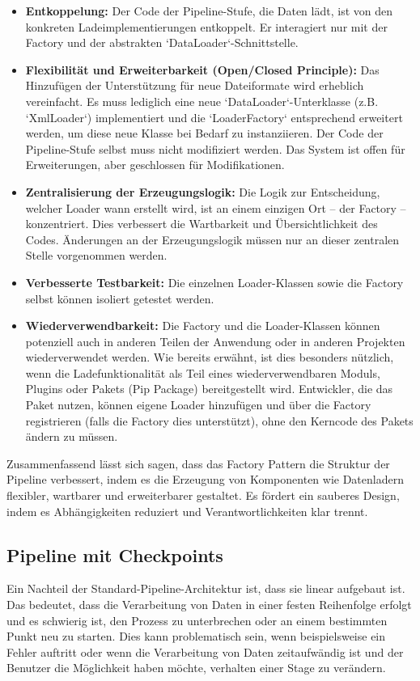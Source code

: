 \documentclass[a4paper]{article} %
\begin{document}
\begin{itemize}
    \item \textbf{Entkoppelung:} Der Code der Pipeline-Stufe, die Daten lädt, ist von den konkreten Ladeimplementierungen entkoppelt. Er interagiert nur mit der Factory und der abstrakten `DataLoader`-Schnittstelle.
    \item \textbf{Flexibilität und Erweiterbarkeit (Open/Closed Principle):} Das Hinzufügen der Unterstützung für neue Dateiformate wird erheblich vereinfacht. Es muss lediglich eine neue `DataLoader`-Unterklasse (z.B. `XmlLoader`) implementiert und die `LoaderFactory` entsprechend erweitert werden, um diese neue Klasse bei Bedarf zu instanziieren. Der Code der Pipeline-Stufe selbst muss nicht modifiziert werden. Das System ist offen für Erweiterungen, aber geschlossen für Modifikationen.
    \item \textbf{Zentralisierung der Erzeugungslogik:} Die Logik zur Entscheidung, welcher Loader wann erstellt wird, ist an einem einzigen Ort – der Factory – konzentriert. Dies verbessert die Wartbarkeit und Übersichtlichkeit des Codes. Änderungen an der Erzeugungslogik müssen nur an dieser zentralen Stelle vorgenommen werden.
    \item \textbf{Verbesserte Testbarkeit:} Die einzelnen Loader-Klassen sowie die Factory selbst können isoliert getestet werden.
    \item \textbf{Wiederverwendbarkeit:} Die Factory und die Loader-Klassen können potenziell auch in anderen Teilen der Anwendung oder in anderen Projekten wiederverwendet werden. Wie bereits erwähnt, ist dies besonders nützlich, wenn die Ladefunktionalität als Teil eines wiederverwendbaren Moduls, Plugins oder Pakets (Pip Package) bereitgestellt wird. Entwickler, die das Paket nutzen, können eigene Loader hinzufügen und über die Factory registrieren (falls die Factory dies unterstützt), ohne den Kerncode des Pakets ändern zu müssen.
\end{itemize}

Zusammenfassend lässt sich sagen, dass das Factory Pattern die Struktur der Pipeline verbessert, indem es die Erzeugung von Komponenten wie Datenladern flexibler, wartbarer und erweiterbarer gestaltet. Es fördert ein sauberes Design, indem es Abhängigkeiten reduziert und Verantwortlichkeiten klar trennt.

\subsection{Pipeline mit Checkpoints}
Ein Nachteil der Standard-Pipeline-Architektur ist, dass sie linear aufgebaut ist. Das bedeutet, dass die Verarbeitung von Daten in einer festen Reihenfolge erfolgt und es schwierig ist, den Prozess zu unterbrechen oder an einem bestimmten Punkt neu zu starten. Dies kann problematisch sein, wenn beispielsweise ein Fehler auftritt oder wenn die Verarbeitung von Daten zeitaufwändig ist und der Benutzer die Möglichkeit haben möchte, verhalten einer Stage zu verändern.
\end{document}
